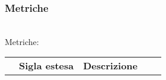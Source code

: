 \subsubsection{Metriche}\mbox{}\\
Metriche:
\begin{table}[H]
    \centering
    \renewcommand{\arraystretch}{1.8}
    \begin{tabular}{| c | p{4.2cm} | p{5cm} |c |  c  }
        \rowcolor[HTML]{a52a2a}
        \multicolumn{1}{c}{\color[HTML]{FFFFFF} \textbf{Codice}}       &
        \multicolumn{1}{c}{\color[HTML]{FFFFFF} \textbf{Sigla estesa}} &
        \multicolumn{1}{c}{\color[HTML]{FFFFFF} \textbf{Descrizione}}                                                                                                                                                                                                                                      \\


\end{tabular}
\end{table}

